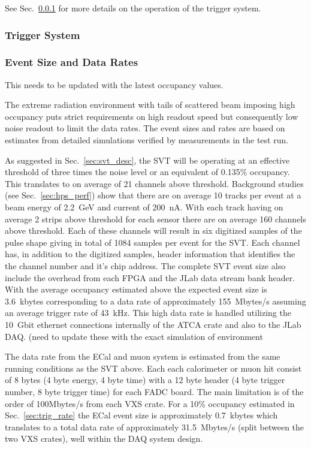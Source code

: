 See Sec.~\ref{sec:triggerdaq} for more details on the operation of the trigger system.


\subsubsection{Trigger System}
\label{sec:triggerdaq}


\subsubsection{Event Size and Data Rates}

{\color{red}This needs to be updated with the latest occupancy values.}

The extreme radiation environment with tails of scattered beam imposing high occupancy
 puts strict requirements on high readout speed but consequently low noise readout to limit 
 the data rates. The event sizes and rates are based on estimates from detailed simulations 
 verified by measurements in the test run. 
  
As suggested in Sec.~\ref{sec:svt_desc}, the SVT will be operating at an effective threshold of three
times the noise level or an equivalent of 0.135\% occupancy. This translates to on average of 21 channels above threshold. Background studies (see Sec.~\ref{sec:hps_perf}) show that 
there are on average 10 tracks per event at a beam energy of 2.2~GeV and current of 
200~nA. With each track 
having on average 2 strips above threshold for each sensor there are on average 160 channels above threshold. Each of these channels will result in six digitized samples of the 
pulse shape giving in total of 1084 samples per event for the SVT.
Each channel has, in addition to the digitized samples,  header information that identifies the 
the channel number and it's chip address. The complete SVT event size also 
include the overhead from each FPGA and the JLab data stream bank header.  
With the average occupancy 
estimated above the expected event size is 3.6~kbytes corresponding to a data rate of 
approximately 155~Mbytes/s assuming an average trigger rate of 43~kHz.  
This high data rate is handled utilizing 
the 10~Gbit ethernet connections internally of the ATCA crate and also to the JLab DAQ.
{\color{red} (need to update these with the exact simulation of environment}


The data rate from the ECal and muon system is estimated from the same running 
conditions as the SVT above. 
Each each calorimeter or muon hit consist of 8 bytes (4 byte energy, 4 byte time)
 with a 12 byte header (4 byte trigger number, 8 byte trigger time) for each FADC board. 
 The main limitation is of the order of 100Mbytes/s from each VXS crate. For a 
 10\% occupancy estimated in Sec.~\ref{sec:trig_rate} the ECal event size is approximately 0.7~kbytes which translates to a total data rate of approximately 31.5~Mbytes/s 
(split between the two VXS crates), well within the DAQ system design. 

